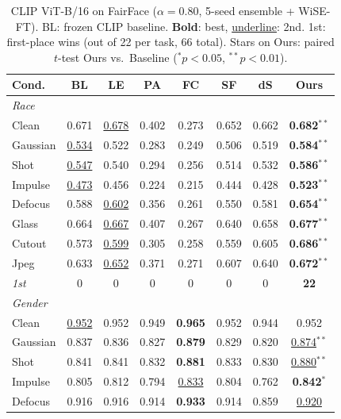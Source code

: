 \begin{table}[htbp]
\caption{CLIP ViT-B/16 on FairFace ($\alpha{=}0.80$, 5-seed ensemble + WiSE-FT). BL: frozen CLIP baseline. \textbf{Bold}: best, \underline{underline}: 2nd. 1st: first-place wins (out of 22 per task, 66 total). Stars on Ours: paired $t$-test Ours vs.\ Baseline ($^{*}\!p{<}0.05$, $^{**}\!p{<}0.01$).}
\label{tab:app_clip_ff}
\centering
\scriptsize
\setlength{\tabcolsep}{3pt}
\renewcommand{\arraystretch}{0.9}
\begin{tabular}{lccccccc}
\toprule
Cond. & BL & LE & PA & FC & SF & dS & \textbf{Ours} \\
\midrule
\multicolumn{8}{l}{\textit{Race}} \\
Clean      & 0.671 & \underline{0.678} & 0.402 & 0.273 & 0.652 & 0.662 & \textbf{0.682}$^{**}$ \\
Gaussian   & \underline{0.534} & 0.522 & 0.283 & 0.249 & 0.506 & 0.519 & \textbf{0.584}$^{**}$ \\
Shot       & \underline{0.547} & 0.540 & 0.294 & 0.256 & 0.514 & 0.532 & \textbf{0.586}$^{**}$ \\
Impulse    & \underline{0.473} & 0.456 & 0.224 & 0.215 & 0.444 & 0.428 & \textbf{0.523}$^{**}$ \\
Defocus    & 0.588 & \underline{0.602} & 0.356 & 0.261 & 0.550 & 0.581 & \textbf{0.654}$^{**}$ \\
Glass      & 0.664 & \underline{0.667} & 0.407 & 0.267 & 0.640 & 0.658 & \textbf{0.677}$^{**}$ \\
Cutout     & 0.573 & \underline{0.599} & 0.305 & 0.258 & 0.559 & 0.605 & \textbf{0.686}$^{**}$ \\
Jpeg       & 0.633 & \underline{0.652} & 0.371 & 0.271 & 0.607 & 0.640 & \textbf{0.672}$^{**}$ \\
\textit{1st} & 0 & 0 & 0 & 0 & 0 & 0 & \textbf{22} \\
\midrule
\multicolumn{8}{l}{\textit{Gender}} \\
Clean      & \underline{0.952} & 0.952 & 0.949 & \textbf{0.965} & 0.952 & 0.944 & 0.952 \\
Gaussian   & 0.837 & 0.836 & 0.827 & \textbf{0.879} & 0.829 & 0.820 & \underline{0.874}$^{**}$ \\
Shot       & 0.841 & 0.841 & 0.832 & \textbf{0.881} & 0.833 & 0.830 & \underline{0.880}$^{**}$ \\
Impulse    & 0.805 & 0.812 & 0.794 & \underline{0.833} & 0.804 & 0.762 & \textbf{0.842}$^{*}$ \\
Defocus    & 0.916 & 0.916 & 0.914 & \textbf{0.933} & 0.914 & 0.859 & \underline{0.920} \\

\end{tabular}
\end{table}
